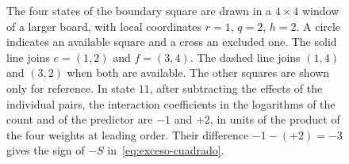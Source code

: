 \begin{figure}[htbp]
\centering
{}
\caption{The four states of the boundary square are drawn in a \(4\times4\) window of a larger board,
with local coordinates \(r=1\), \(q=2\), \(h=2\). A circle indicates an available square and a cross an
excluded one. The solid line joins \(e=(1,2)\) and \(f=(3,4)\). The dashed line joins \((1,4)\) and
\((3,2)\) when both are available. The other squares are shown only for reference. In state \(11\), after
subtracting the effects of the individual pairs, the interaction coefficients in the logarithms of the
count and of the predictor are \(-1\) and \(+2\), in units of the product of the four weights at leading
order. Their difference \(-1-(+2)=-3\) gives the sign of \(-S\) in~\eqref{eq:exceso-cuadrado}.}
\label{fig:frontera}
\end{figure}
